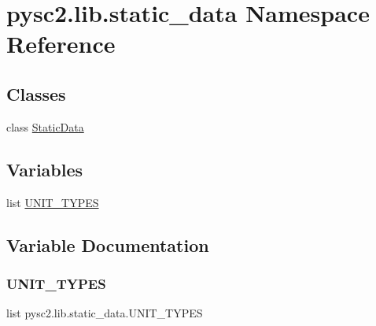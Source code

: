\hypertarget{namespacepysc2_1_1lib_1_1static__data}{}\section{pysc2.\+lib.\+static\+\_\+data Namespace Reference}
\label{namespacepysc2_1_1lib_1_1static__data}
\subsection*{Classes}
\begin{DoxyCompactItemize}
\item 
class \mbox{\hyperlink{classpysc2_1_1lib_1_1static__data_1_1_static_data}{Static\+Data}}
\end{DoxyCompactItemize}
\subsection*{Variables}
\begin{DoxyCompactItemize}
\item 
list \mbox{\hyperlink{namespacepysc2_1_1lib_1_1static__data_a5118e45819ff327a98e557243d29937f}{U\+N\+I\+T\+\_\+\+T\+Y\+P\+ES}}
\end{DoxyCompactItemize}


\subsection{Variable Documentation}
\mbox{\label{namespacepysc2_1_1lib_1_1static__data_a5118e45819ff327a98e557243d29937f}} 
\subsubsection{\texorpdfstring{U\+N\+I\+T\+\_\+\+T\+Y\+P\+ES}{UNIT\_TYPES}}
{\footnotesize\ttfamily list pysc2.\+lib.\+static\+\_\+data.\+U\+N\+I\+T\+\_\+\+T\+Y\+P\+ES}

